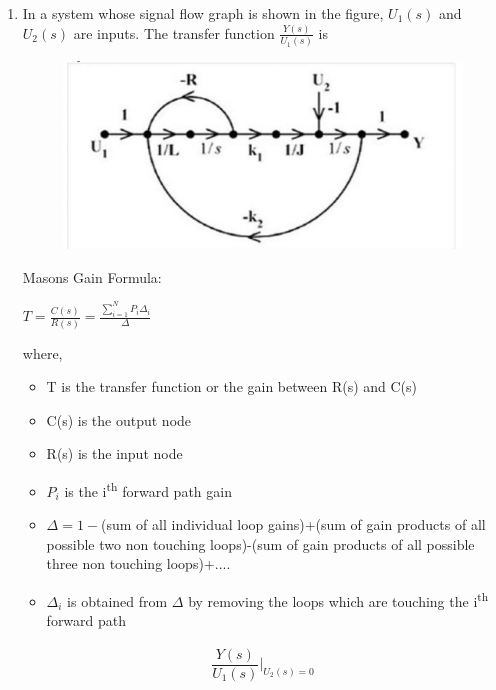 \begin{enumerate}[label=\thesection.\arabic*.,ref=\thesection.\theenumi]
\item In a system whose signal flow graph is shown in the figure, $U_1(s)$ and $U_2(s)$ are inputs. The transfer function $\frac{Y(s)}{U_1(s)}$ is

\begin{figure}[!h]
  \includegraphics[width=\columnwidth]{image.eps}
  
\end{figure}



\solution

Masons Gain Formula:

$T=\frac{C(s)}{R(s)}=\frac{\sum_{i=1}^{N}P_i \Delta_i }{\Delta}$

where,
\begin{itemize}
    \item T is the transfer function or the gain between R(s) and C(s)
    \item C(s) is the output node
    \item R(s) is the input node
    \item $P_i$ is the i\textsuperscript{th} forward path gain
    \item $\Delta= 1 - $(sum of all individual loop gains)+(sum of gain products of all possible two non touching loops)-(sum of gain products of all possible three non touching loops)+.... 
    \item $\Delta_i$ is obtained from $\Delta$ by removing the loops which are touching the i\textsuperscript{th} forward path  
     
    
    
\end{itemize}


\begin{align}
\dfrac{Y(s)}{U_1(s)}\Biggr|_{U_2(s)=0}
\end{align}


\end{enumerate}
